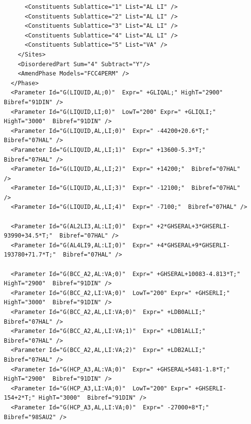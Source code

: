 \documentclass{article}
\begin{document}
\begin{appendices}
\begin{verbatim}
      <Constituents Sublattice="1" List="AL LI" />
      <Constituents Sublattice="2" List="AL LI" />
      <Constituents Sublattice="3" List="AL LI" />
      <Constituents Sublattice="4" List="AL LI" />
      <Constituents Sublattice="5" List="VA" />
    </Sites>
    <DisorderedPart Sum="4" Subtract="Y"/>
    <AmendPhase Models="FCC4PERM" />
  </Phase>
  <Parameter Id="G(LIQUID,AL;0)"  Expr=" +GLIQAL;" HighT="2900"  Bibref="91DIN" />
  <Parameter Id="G(LIQUID,LI;0)"  LowT="200" Expr=" +GLIQLI;" HighT="3000"  Bibref="91DIN" />
  <Parameter Id="G(LIQUID,AL,LI;0)"  Expr=" -44200+20.6*T;"  Bibref="07HAL" />
  <Parameter Id="G(LIQUID,AL,LI;1)"  Expr=" +13600-5.3*T;"  Bibref="07HAL" />
  <Parameter Id="G(LIQUID,AL,LI;2)"  Expr=" +14200;"  Bibref="07HAL" />
  <Parameter Id="G(LIQUID,AL,LI;3)"  Expr=" -12100;"  Bibref="07HAL" />
  <Parameter Id="G(LIQUID,AL,LI;4)"  Expr=" -7100;"  Bibref="07HAL" />

  <Parameter Id="G(AL2LI3,AL:LI;0)"  Expr=" +2*GHSERAL+3*GHSERLI-93990+34.5*T;"  Bibref="07HAL" />
  <Parameter Id="G(AL4LI9,AL:LI;0)"  Expr=" +4*GHSERAL+9*GHSERLI-193780+71.7*T;"  Bibref="07HAL" />

  <Parameter Id="G(BCC_A2,AL:VA;0)"  Expr=" +GHSERAL+10083-4.813*T;" HighT="2900"  Bibref="91DIN" />
  <Parameter Id="G(BCC_A2,LI:VA;0)"  LowT="200" Expr=" +GHSERLI;" HighT="3000"  Bibref="91DIN" />
  <Parameter Id="G(BCC_A2,AL,LI:VA;0)"  Expr=" +LDB0ALLI;"  Bibref="07HAL" />
  <Parameter Id="G(BCC_A2,AL,LI:VA;1)"  Expr=" +LDB1ALLI;"  Bibref="07HAL" />
  <Parameter Id="G(BCC_A2,AL,LI:VA;2)"  Expr=" +LDB2ALLI;"  Bibref="07HAL" />
  <Parameter Id="G(HCP_A3,AL:VA;0)"  Expr=" +GHSERAL+5481-1.8*T;" HighT="2900"  Bibref="91DIN" />
  <Parameter Id="G(HCP_A3,LI:VA;0)"  LowT="200" Expr=" +GHSERLI-154+2*T;" HighT="3000"  Bibref="91DIN" />
  <Parameter Id="G(HCP_A3,AL,LI:VA;0)"  Expr=" -27000+8*T;"  Bibref="98SAU2" />


\end{verbatim}
\end{appendices}
\end{document}
